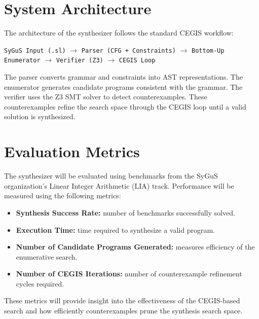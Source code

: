 \documentclass[10pt]{article}
\begin{document}
\section*{System Architecture}

The architecture of the synthesizer follows the standard CEGIS workflow:

\begin{center}
\texttt{SyGuS Input (.sl)} $\rightarrow$ 
\texttt{Parser (CFG + Constraints)} $\rightarrow$ 
\texttt{Bottom-Up Enumerator} $\rightarrow$ 
\texttt{Verifier (Z3)} $\rightarrow$ 
\texttt{CEGIS Loop}
\end{center}

The parser converts grammar and constraints into AST representations. The enumerator generates candidate programs consistent with the grammar. The verifier uses the Z3 SMT solver to detect counterexamples. These counterexamples refine the search space through the CEGIS loop until a valid solution is synthesized.

\section*{Evaluation Metrics}

The synthesizer will be evaluated using benchmarks from the SyGuS organization’s Linear Integer Arithmetic (LIA) track. Performance will be measured using the following metrics:

\begin{itemize}
\item \textbf{Synthesis Success Rate:} number of benchmarks successfully solved.
\item \textbf{Execution Time:} time required to synthesize a valid program.
\item \textbf{Number of Candidate Programs Generated:} measures efficiency of the enumerative search.
\item \textbf{Number of CEGIS Iterations:} number of counterexample refinement cycles required.
\end{itemize}

These metrics will provide insight into the effectiveness of the CEGIS-based search and how efficiently counterexamples prune the synthesis search space.
\end{document}
